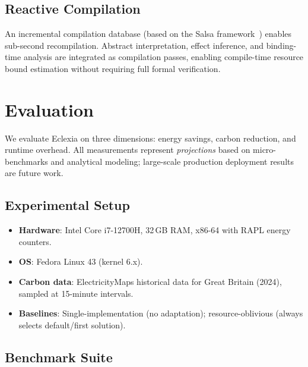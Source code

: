 \documentclass[11pt,a4paper]{article}
\begin{document}
\subsection{Reactive Compilation}

An incremental compilation database (based on the Salsa framework~\cite{salsa})
enables sub-second recompilation.  Abstract interpretation, effect inference,
and binding-time analysis are integrated as compilation passes, enabling
compile-time resource bound estimation without requiring full formal
verification.


\section{Evaluation}
\label{sec:evaluation}

We evaluate Eclexia on three dimensions: energy savings, carbon reduction, and
runtime overhead.  All measurements represent \emph{projections} based on
micro-benchmarks and analytical modeling; large-scale production deployment
results are future work.

\subsection{Experimental Setup}

\begin{itemize}
  \item \textbf{Hardware}: Intel Core i7-12700H, 32\,GB RAM, x86-64 with RAPL
    energy counters.
  \item \textbf{OS}: Fedora Linux 43 (kernel 6.x).
  \item \textbf{Carbon data}: ElectricityMaps historical data for Great
    Britain (2024), sampled at 15-minute intervals.
  \item \textbf{Baselines}: Single-implementation (no adaptation); resource-oblivious
    (always selects default/first solution).
\end{itemize}

\subsection{Benchmark Suite}
\end{document}
